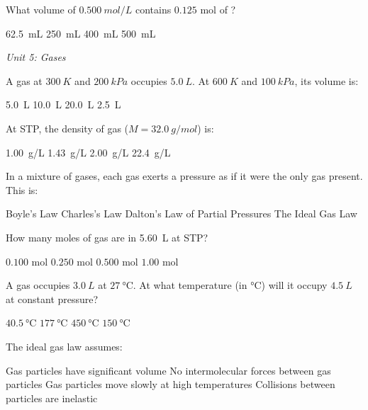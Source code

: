 \documentclass[addpoints]{exam}
\begin{document}
\begin{questions}
\question[1] What volume of $\SI{0.500}{mol/L}$  contains $0.125$ mol of ?
\begin{choices}
    \choice \SI{62.5}{mL}
    \correctchoice \SI{250}{mL}
    \choice \SI{400}{mL}
    \choice \SI{500}{mL}
\end{choices}

\vspace{3mm}
\noindent\textit{Unit 5: Gases}
\vspace{3mm}

\question[1] A gas at $\SI{300}{K}$ and $\SI{200}{kPa}$ occupies $\SI{5.0}{L}$.
At $\SI{600}{K}$ and $\SI{100}{kPa}$, its volume is:
\begin{choices}
    \choice \SI{5.0}{L}
    \choice \SI{10.0}{L}
    \correctchoice \SI{20.0}{L}
    \choice \SI{2.5}{L}
\end{choices}

\question[1] At STP, the density of  gas ($M = \SI{32.0}{g/mol}$) is:
\begin{choices}
    \choice \SI{1.00}{g/L}
    \correctchoice \SI{1.43}{g/L}
    \choice \SI{2.00}{g/L}
    \choice \SI{22.4}{g/L}
\end{choices}

\question[1] In a mixture of gases, each gas exerts a pressure as if it were the only
gas present. This is:
\begin{choices}
    \choice Boyle's Law
    \choice Charles's Law
    \correctchoice Dalton's Law of Partial Pressures
    \choice The Ideal Gas Law
\end{choices}

\question[1] How many moles of gas are in \SI{5.60}{L} at STP?
\begin{choices}
    \choice $0.100$ mol
    \correctchoice $0.250$ mol
    \choice $0.500$ mol
    \choice $1.00$ mol
\end{choices}

\question[1] A gas occupies $\SI{3.0}{L}$ at $\SI{27}{\celsius}$. At what temperature
(in \si{\celsius}) will it occupy $\SI{4.5}{L}$ at constant pressure?
\begin{choices}
    \choice $\SI{40.5}{\celsius}$
    \correctchoice $\SI{177}{\celsius}$
    \choice $\SI{450}{\celsius}$
    \choice $\SI{150}{\celsius}$
\end{choices}

\question[1] The ideal gas law assumes:
\begin{choices}
    \choice Gas particles have significant volume
    \correctchoice No intermolecular forces between gas particles
    \choice Gas particles move slowly at high temperatures
    \choice Collisions between particles are inelastic
\end{choices}


\end{questions}
\end{document}

